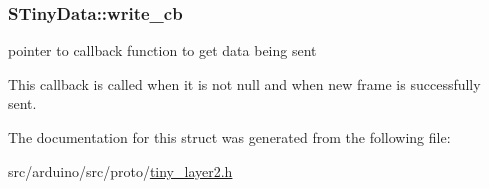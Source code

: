 \subsubsection[{write\+\_\+cb}]{ S\+Tiny\+Data\+::write\+\_\+cb}\label{structSTinyData_ada334c88e86bfd2c10191f65818c3fb3}


pointer to callback function to get data being sent 

This callback is called when it is not null and when new frame is successfully sent. 

The documentation for this struct was generated from the following file\+:\begin{DoxyCompactItemize}
\item 
src/arduino/src/proto/\hyperlink{src_2arduino_2src_2proto_2tiny__layer2_8h}{tiny\+\_\+layer2.\+h}\end{DoxyCompactItemize}
